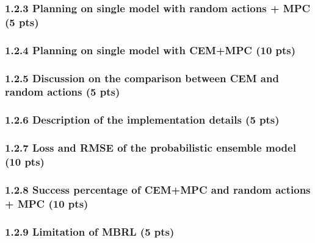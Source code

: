 \documentclass[12pt]{article}
\begin{document}
\subsubsection*{1.2.3 Planning on single model with random actions + MPC (5 pts)}
\begin{solution}[height=5cm]
\end{solution}

\subsubsection*{1.2.4 Planning on single model with CEM+MPC (10 pts)}
\begin{solution}[height=10cm]
\end{solution}

\newpage
\subsubsection*{1.2.5 Discussion on the comparison between CEM and random actions (5 pts)}
\begin{solution}[height=12cm]
\end{solution}

\newpage
\subsubsection*{1.2.6 Description of the implementation details (5 pts)}
\begin{solution}[height=20cm]
\end{solution}

\subsubsection*{1.2.7 Loss and RMSE of the probabilistic ensemble model (10 pts)}
\begin{solution}[height=15cm]
\end{solution}

\newpage
\subsubsection*{1.2.8 Success percentage of CEM+MPC and random actions + MPC (10 pts)}
\begin{solution}[height=10cm]
\end{solution}

\subsubsection*{1.2.9 Limitation of MBRL (5 pts)}
\begin{solution}[height=8cm]
\end{solution}
\clearpage
\end{document}
